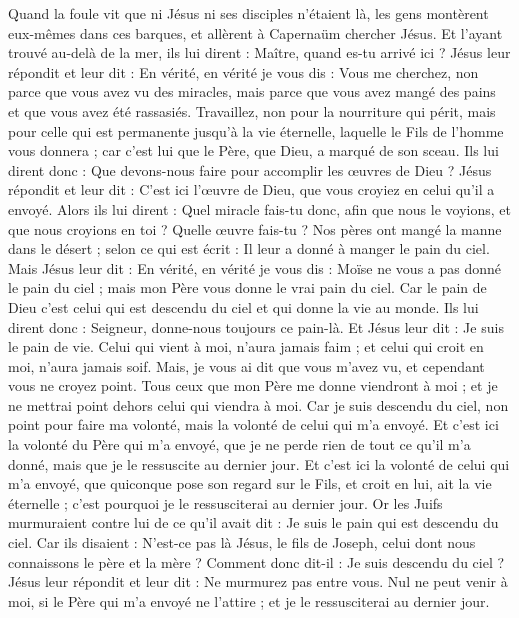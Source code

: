 \begin{multicols}{2}
Quand la foule vit que ni Jésus ni ses disciples n'étaient là, les gens montèrent eux-mêmes dans ces barques, et allèrent à Capernaüm chercher Jésus.
Et l'ayant trouvé au-delà de la mer, ils lui dirent : Maître, quand es-tu arrivé ici ?
Jésus leur répondit et leur dit : En vérité, en vérité je vous dis : Vous me cherchez, non parce que vous avez vu des miracles, mais parce que vous avez mangé des pains et que vous avez été rassasiés.
Travaillez, non pour la nourriture qui périt, mais pour celle qui est permanente jusqu'à la vie éternelle, laquelle le Fils de l'homme vous donnera ; car c'est lui que le Père, que Dieu, a marqué de son sceau.
Ils lui dirent donc : Que devons-nous faire pour accomplir les œuvres de Dieu ?
Jésus répondit et leur dit : C'est ici l'œuvre de Dieu, que vous croyiez en celui qu'il a envoyé.
Alors ils lui dirent : Quel miracle fais-tu donc, afin que nous le voyions, et que nous croyions en toi ? Quelle œuvre fais-tu ?
Nos pères ont mangé la manne dans le désert ; selon ce qui est écrit : Il leur a donné à manger le pain du ciel.
Mais Jésus leur dit : En vérité, en vérité je vous dis : Moïse ne vous a pas donné le pain du ciel ; mais mon Père vous donne le vrai pain du ciel.
Car le pain de Dieu c'est celui qui est descendu du ciel et qui donne la vie au monde.
Ils lui dirent donc : Seigneur, donne-nous toujours ce pain-là.
Et Jésus leur dit : Je suis le pain de vie. Celui qui vient à moi, n'aura jamais faim ; et celui qui croit en moi, n'aura jamais soif.
Mais, je vous ai dit que vous m'avez vu, et cependant vous ne croyez point.
Tous ceux que mon Père me donne viendront à moi ; et je ne mettrai point dehors celui qui viendra à moi.
Car je suis descendu du ciel, non point pour faire ma volonté, mais la volonté de celui qui m'a envoyé.
Et c'est ici la volonté du Père qui m'a envoyé, que je ne perde rien de tout ce qu'il m'a donné, mais que je le ressuscite au dernier jour.
Et c'est ici la volonté de celui qui m'a envoyé, que quiconque pose son regard sur le Fils, et croit en lui, ait la vie éternelle ; c'est pourquoi je le ressusciterai au dernier jour.
Or les Juifs murmuraient contre lui de ce qu'il avait dit : Je suis le pain qui est descendu du ciel.
Car ils disaient : N'est-ce pas là Jésus, le fils de Joseph, celui dont nous connaissons le père et la mère ? Comment donc dit-il : Je suis descendu du ciel ?
Jésus leur répondit et leur dit : Ne murmurez pas entre vous.
Nul ne peut venir à moi, si le Père qui m'a envoyé ne l'attire ; et je le ressusciterai au dernier jour.

\end{multicols}
